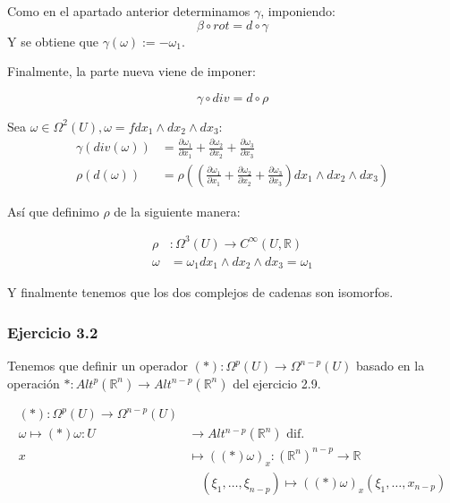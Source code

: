 Como en el apartado anterior determinamos $\gamma $, imponiendo:
 $$\beta \circ rot = d \circ \gamma $$
Y se obtiene que $\gamma (\omega ) := -\omega_1 $. 

Finalmente, la parte nueva viene de imponer:

$$ \gamma \circ div = d \circ \rho$$

Sea $\omega\in \Omega^2(U), \omega = f dx_1\wedge dx_2 \wedge dx_3 $:
\begin{equation}
  \begin{split}
\gamma ( div (\omega )) &= \frac{\partial \omega_1}{\partial x_1}+\frac{\partial \omega_2}{\partial x_2}+\frac{\partial \omega_3}{\partial x_3}\\
\rho (d  (\omega)) &= \rho ((\frac{\partial \omega_1}{\partial x_1}+\frac{\partial \omega_2}{\partial x_2}+\frac{\partial \omega_3}{\partial x_3})dx_1\wedge dx_2 \wedge dx_3 ) 
 \end{split}
\end{equation}

Así que definimo $\rho $ de la siguiente manera: 

\begin{equation}
  \begin{split}
    \rho &: \Omega^3(U)\rightarrow C^\infty (U,\mathbb{R})\\
    \omega &= \omega_1 dx_1\wedge dx_2 \wedge dx_3 = \omega_1    
  \end{split}
\end{equation}

Y finalmente tenemos que los dos complejos de cadenas son isomorfos. 

\subsubsection{Ejercicio 3.2}

Tenemos que definir un operador $(*):\Omega^p(U) \rightarrow \Omega^{n-p}(U)$ basado en la operación $*:Alt^p(\mathbb{R}^n)\rightarrow Alt^{n-p}(\mathbb{R}^n)$ del ejercicio 2.9. 

\begin{equation}
  \begin{split}
    (*): \Omega^p(U)\rightarrow \Omega^{n-p}(U)& \\
    \omega \mapsto (*)\omega : U & \rightarrow Alt^{n-p}(\mathbb{R}^n) \text{ dif.}\\
    x & \mapsto ((*)\omega)_x:(\mathbb{R}^n)^{n-p} \rightarrow \mathbb{R}\\
    &\quad (\xi_1,\dots,\xi_{n-p})\mapsto ((*)\omega)_x(\xi_1,\dots,x_{n-p})
  \end{split}
\end{equation}

